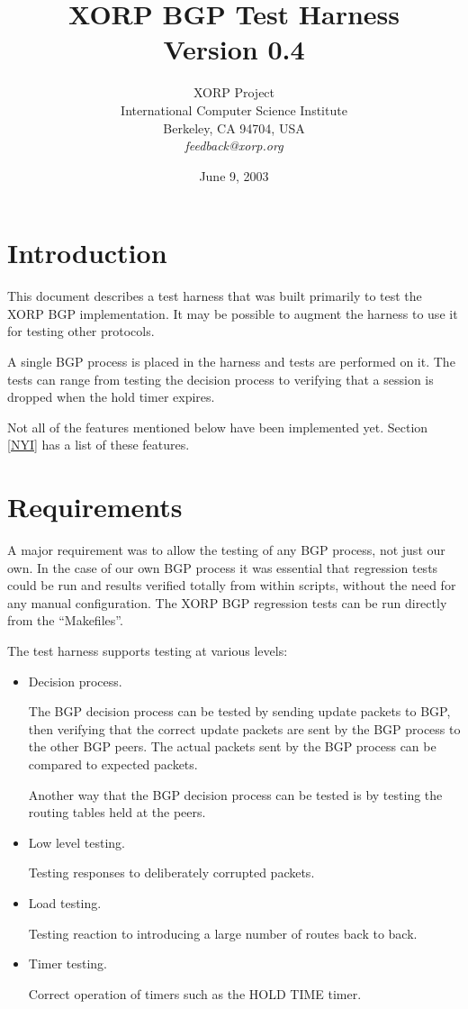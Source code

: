 \documentclass[11pt]{article}
\title{XORP BGP Test Harness \\
\vspace{1ex}
Version 0.4}
\author{ XORP Project                                   \\
         International Computer Science Institute       \\
         Berkeley, CA 94704, USA                        \\
         {\it feedback@xorp.org}
}
\date{June 9, 2003}
\begin{document}
\maketitle

\section{Introduction}

This document describes a test harness that was built primarily to
test the XORP BGP implementation. It may be possible to augment the
harness to use it for testing other protocols.

A single BGP process is placed in the harness and tests
are performed on it. The tests can range from testing the decision
process to verifying that a session is dropped when the hold timer expires.

Not all of the features mentioned below have been implemented yet.
Section \ref{NYI} has a list of these features.

\section{Requirements}

A major requirement was to allow the testing of any BGP process, not
just our own. In the case of our own BGP process it was essential that
regression tests could be run and results verified totally from within
scripts, without the need for any manual configuration. The
XORP BGP regression tests can be run directly from the ``Makefiles''.
\newline

The test harness supports testing at various levels:

\begin{itemize}
\item Decision process.

  The BGP decision process can be tested by sending update packets to
  BGP, then verifying that the correct update packets are sent by the
  BGP process to the other BGP peers. The actual packets sent by the
  BGP process can be compared to expected packets. 

  Another way that the BGP decision process can be tested is by
  testing the routing tables held at the peers.

\item Low level testing.

 Testing responses to deliberately corrupted packets.

\item Load testing. 

  Testing reaction to introducing a large number of routes back
  to back.

\item Timer testing.

  Correct operation of timers such as the HOLD TIME timer.

\end{itemize}
\end{document}
